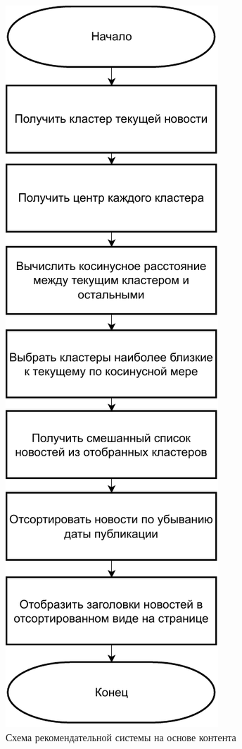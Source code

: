 \begin{figure}[H]
	\centering
	\includegraphics[scale=1]{img/RecsDiag.pdf}
	\caption{Схема рекомендательной системы на основе контента}
	\label{RecsDiag}
\end{figure}

